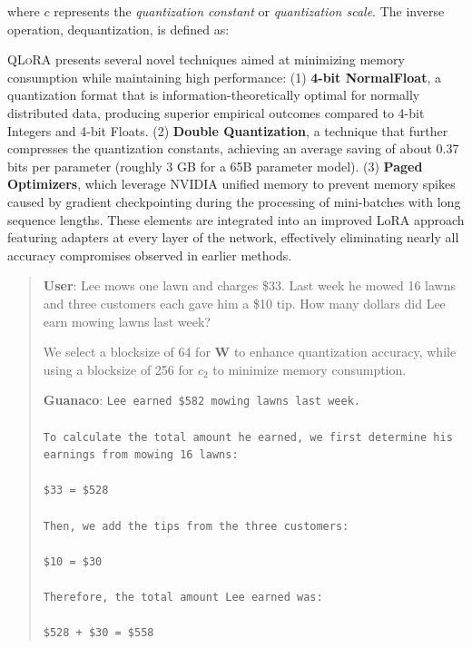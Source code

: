 where $c$ represents the {\em quantization constant} or {\em quantization scale}. The inverse operation, dequantization, is defined as:

\textsc{QLoRA} presents several novel techniques aimed at minimizing memory consumption while maintaining high performance: (1) \textbf{4-bit NormalFloat}, a quantization format that is information-theoretically optimal for normally distributed data, producing superior empirical outcomes compared to 4-bit Integers and 4-bit Floats. (2) \textbf{Double Quantization}, a technique that further compresses the quantization constants, achieving an average saving of about 0.37 bits per parameter (roughly 3 GB for a 65B parameter model). (3) \textbf{Paged Optimizers}, which leverage NVIDIA unified memory to prevent memory spikes caused by gradient checkpointing during the processing of mini-batches with long sequence lengths. These elements are integrated into an improved LoRA approach featuring adapters at every layer of the network, effectively eliminating nearly all accuracy compromises observed in earlier methods.

\begin{quote}
    \textbf{User}: Lee mows one lawn and charges \$33. Last week he mowed 16 lawns and three customers each gave him a \$10 tip. How many dollars did Lee earn mowing lawns last week?

We select a blocksize of 64 for $\mathbf{W}$ to enhance quantization accuracy, while using a blocksize of 256 for $c_2$ to minimize memory consumption.

    \textbf{Guanaco}: \texttt{Lee earned \$582 mowing lawns last week. \\ \\ To calculate the total amount he earned, we first determine his earnings from mowing 16 lawns: \\ \\  \$33  = \$528 \\ \\ Then, we add the tips from the three customers: \\  \\ \$10  = \$30 \\ \\ Therefore, the total amount Lee earned was: \\ \\ \$528 + \$30 = \$558}
\end{quote}

